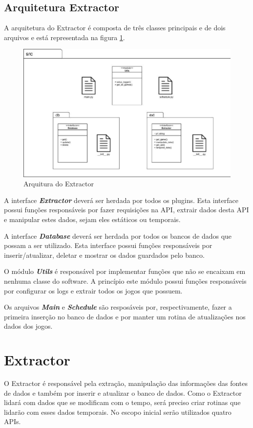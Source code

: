 \subsection{Arquitetura Extractor}
A arquitetura do Extractor é composta de três classes principais e de dois arquivos e está representada na figura \ref{image:extractor}.
\begin{figure} [H]
\centering
\includegraphics[scale=0.5]{figuras/arquiteturaExtractor.eps}
\caption{Arquitura do Extractor}
\label{image:extractor}
\end{figure}
A interface \textit{\textbf{Extractor}} deverá ser herdada por todos os plugins. Esta interface possui funções responsáveis por fazer requisições na API, extrair dados desta API e manipular estes dados, sejam eles estáticos ou temporais.

A interface \textit{\textbf{Database}} deverá ser herdada por todos os bancos de dados que possam a ser utilizado. Esta interface possui funções responsáveis por inserir/atualizar, deletar e mostrar os dados guardados pelo banco.

O módulo \textit{\textbf{Utils}} é responsável por implementar funções que não se encaixam em nenhuma classe do software. A princípio este módulo possui funções responsáveis por configurar os logs e extrair todos os jogos que possuem.

Os arquivos \textit{\textbf{Main}} e \textit{\textbf{Schedule}} são resposáveis por, respectivamente, fazer a primeira inserção no banco de dados e por manter um rotina de atualizações nos dados dos jogos.

\section{Extractor}
O Extractor é responsável pela extração, manipulação das informações das fontes de dados e também por inserir e atualizar o banco de dados. Como o Extractor lidará com dados que se modificam com o tempo, será preciso criar rotinas que lidarão com esses dados temporais. No escopo inicial serão utilizados quatro APIs.

